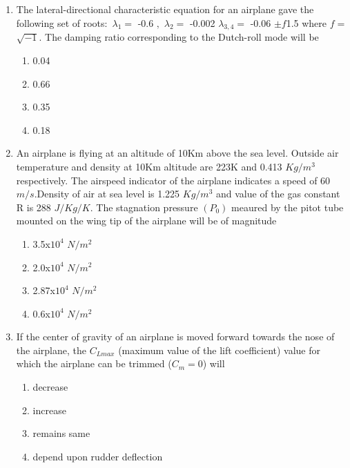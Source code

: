 \documentclass[journal]{IEEEtran}
\begin{document}
\begin{enumerate}[start=35]
	\item The lateral-directional characteristic equation for an airplane gave the following set of roots$:$ $\lambda_1 =$ -0.6 $,$ $\lambda_2 =$ -0.002 $\lambda_{3,4} =$ -0.06 $\pm f$1.5 where $f =$ $\sqrt{-1}$. The damping ratio corresponding to the Dutch-roll mode will be 
\begin{multicols}{4}
\begin{enumerate}
    \item 0.04
    \item 0.66
    \item 0.35
    \item 0.18
\end{enumerate}
\end{multicols}
    \item An airplane is flying at an altitude of 10Km above the sea level. Outside air temperature and density at 10Km altitude are 223K and 0.413 $Kg/m^{3}$ respectively. The airspeed indicator of the airplane indicates a speed of  60 $m/s$.Density of air at sea level is 1.225 $Kg/m^{3}$ and value of the gas constant R is 288 $J/Kg/K$. The stagnation pressure $(P_0)$ meaured by the pitot tube mounted on the wing tip of the airplane will be of magnitude 
\begin{multicols}{4}
    \begin{enumerate}
        \item 3.5x$10^{4}$ $N/m^{2}$
        \item 2.0x$10^{4}$ $N/m^{2}$
        \item 2.87x$10^{4}$ $N/m^{2}$
        \item 0.6x$10^{4}$ $N/m^{2}$
    \end{enumerate}
\end{multicols}
\item If the center of gravity of an airplane is moved forward towards the nose of the airplane, the $C_{Lmax}$ (maximum value of the lift coefficient) value for which the airplane can be trimmed ($C_{m}=0$) will
\begin{multicols}{2}
    \begin{enumerate}
	    \item decrease 
	    \item increase
	    \item remains same
	    \item depend upon rudder deflection
    \end{enumerate}
\end{multicols}

\end{enumerate}
\end{document}
